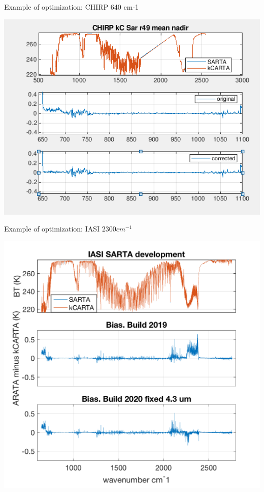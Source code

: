 \documentclass[10pt,t]{beamer}
\begin{document}
\begin{frame}{Example of optimization: CHIRP 640 cm-1}

  \begin{center}
    \includegraphics[width=0.6\linewidth]{./Figs/chirp_optimize1.png}
  \end{center}


\end{frame}
\begin{frame}[shrink=5]{Example of optimization: IASI $2300 cm^{-1}$}

\vspace{-0.5cm}
  \begin{center}
    \includegraphics[width=0.6\linewidth]{./Figs/iasi_sarta_kcarta_mean_bias_4p3um_fx.png}
  \end{center}

\end{frame}
\end{document}
